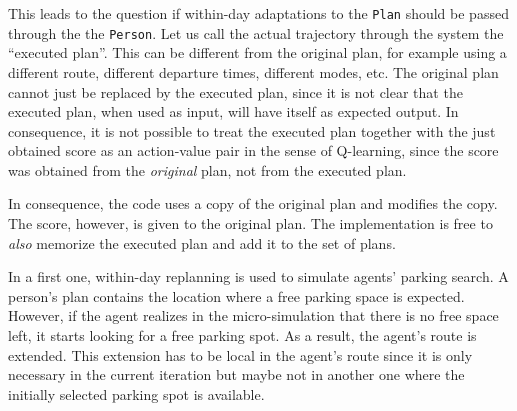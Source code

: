 
This leads to the question if within-day adaptations to the \verb$Plan$ should be passed through the the \verb$Person$.  Let us call the actual trajectory through the system the ``executed plan''.  This can be different from the original plan, for example using a different route, different departure times, different modes, etc.  The original plan cannot just be replaced by the executed plan, since it is not clear that the executed plan, when used as input, will have itself as expected output.  In consequence, it is not possible to treat the executed plan together with the just obtained score as an action-value pair in the sense of Q-learning, since the score was obtained from the \emph{original} plan, not from the executed plan.

In consequence, the code uses a copy of the original plan and modifies the copy.  The score, however, is given to the original plan.  The implementation is free to  \emph{also} memorize the executed plan and add it to the set of plans.




In a first one, within-day replanning is used to simulate agents' parking search. A person's plan contains the location where a free parking space is expected. However, if the agent realizes in the micro-simulation that there is no free space left, it starts looking for a free parking spot. As a result, the agent's route is extended. This extension has to be local in the agent's route since it is only necessary in the current iteration
but maybe not in another one where the initially selected parking spot is available.


